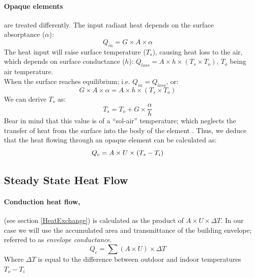 \paragraph{Opaque elements}are treated differently. The input radiant heat depends on the surface absorptance ($\alpha$): 
\begin{equation}
Q_{in}=G\times A\times \alpha
\label{OpInRad}
\end{equation}
The heat input will raise surface temperature ($T_s$), causing heat loss to the air, which depends on surface conductance ($h$): $Q_{loss}=A\times h\times (T_s\times T_o)$, $T_o$ being air temperature.\\
When the surface reaches equilibrium; i.e. $Q_{in}=Q_{loss}$, or:
\begin{equation}
G\times A\times \alpha = A\times h\times (T_s\times T_o)
\end{equation}
We can derive $T_s$ as:
\begin{equation}
T_s=T_o+G\times \frac{\alpha}{h}
\end{equation}
Bear in mind that this value is of a ``sol-air'' temperature; which neglects the transfer of heat from the surface into the body of the element \cite{szokolay08}. Thus, we deduce that the heat flowing through an opaque element can be calculated as:
\begin{equation}
Q_c=A\times U \times (T_s-T_i)
\newline
\end{equation}
\flushleft

\subsection{Steady State Heat Flow}
\paragraph{Conduction heat flow,}(see section \ref{HeatExchange}) is calculated as the product of $A\times U\times \Delta T$. In our case we will use the accumulated area and transmittance of the building envelope; referred to as \emph{envelope conductance}.
\begin{equation}
Q_c=\sum(A\times U)\times \Delta T
\label{EnvConduct}
\end{equation}
{\footnotesize Where $\Delta T$ is equal to the difference between outdoor and indoor temperatures $T_o-T_i$}

